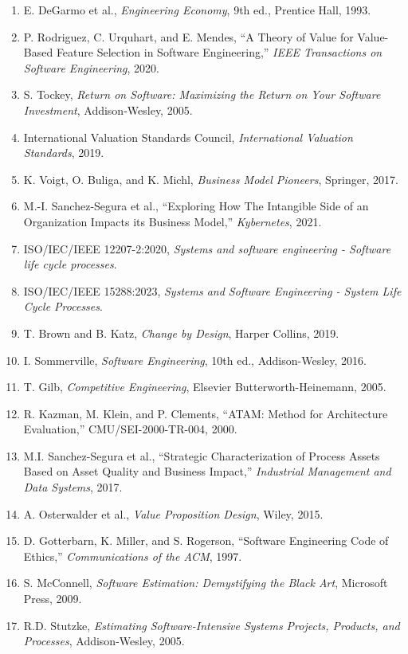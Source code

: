 \documentclass[a4paper,11pt]{article}
\begin{document}
\begin{enumerate}
  \item E. DeGarmo et al., \textit{Engineering Economy}, 9th ed., Prentice Hall, 1993.
  \item P. Rodriguez, C. Urquhart, and E. Mendes, ``A Theory of Value for Value-Based Feature Selection in Software Engineering,'' \textit{IEEE Transactions on Software Engineering}, 2020.
  \item S. Tockey, \textit{Return on Software: Maximizing the Return on Your Software Investment}, Addison-Wesley, 2005.
  \item International Valuation Standards Council, \textit{International Valuation Standards}, 2019.
  \item K. Voigt, O. Buliga, and K. Michl, \textit{Business Model Pioneers}, Springer, 2017.
  \item M.-I. Sanchez-Segura et al., ``Exploring How The Intangible Side of an Organization Impacts its Business Model,'' \textit{Kybernetes}, 2021.
  \item ISO/IEC/IEEE 12207-2:2020, \textit{Systems and software engineering - Software life cycle processes}.
  \item ISO/IEC/IEEE 15288:2023, \textit{Systems and Software Engineering - System Life Cycle Processes}.
  \item T. Brown and B. Katz, \textit{Change by Design}, Harper Collins, 2019.
  \item I. Sommerville, \textit{Software Engineering}, 10th ed., Addison-Wesley, 2016.
  \item T. Gilb, \textit{Competitive Engineering}, Elsevier Butterworth-Heinemann, 2005.
  \item R. Kazman, M. Klein, and P. Clements, ``ATAM: Method for Architecture Evaluation,'' CMU/SEI-2000-TR-004, 2000.
  \item M.I. Sanchez-Segura et al., ``Strategic Characterization of Process Assets Based on Asset Quality and Business Impact,'' \textit{Industrial Management and Data Systems}, 2017.
  \item A. Osterwalder et al., \textit{Value Proposition Design}, Wiley, 2015.
  \item D. Gotterbarn, K. Miller, and S. Rogerson, ``Software Engineering Code of Ethics,'' \textit{Communications of the ACM}, 1997.
  \item S. McConnell, \textit{Software Estimation: Demystifying the Black Art}, Microsoft Press, 2009.
  \item R.D. Stutzke, \textit{Estimating Software-Intensive Systems Projects, Products, and Processes}, Addison-Wesley, 2005.

\end{enumerate}
\end{document}
